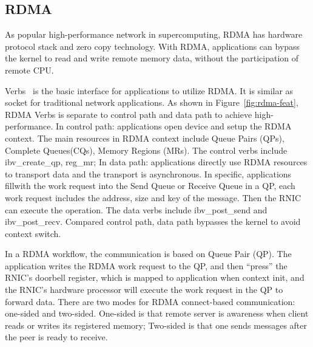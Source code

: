 \subsection{RDMA}
As popular high-performance network in supercomputing, RDMA has hardware protocol stack and zero copy technology. With RDMA, applications can bypass the kernel to read and write remote memory data, without the participation of remote CPU. 

Verbs~\cite{verbs} is the basic interface for applications to utilize RDMA. It is similar as socket for traditional network applications. As shown in Figure~\ref{fig:rdma-feat}, RDMA Verbs is separate to control path and data path to achieve high-performance. In control path: applications open device and setup the RDMA context. The main resources in RDMA context include Queue Pairs (QPs), Complete Queues(CQs), Memory Regions (MRs). The control verbs include ibv\_create\_qp, reg\_mr;  In data path: applications directly use RDMA resources to transport data and the transport is asynchronous. In specific, applications fillwith the work request into the Send Queue or Receive Queue in a QP, each work request includes the address, size and key of the message. Then the RNIC can execute the operation. The data verbs include ibv\_post\_send and ibv\_post\_recv. Compared control path, data path bypasses the kernel to avoid context switch.

In a RDMA workflow, the communication is based on Queue Pair (QP). The application writes the RDMA work request to the QP, and then ``press''  the RNIC's doorbell register, which is mapped to application when context init, and the RNIC's hardware processor will execute the work request in the QP to forward data. There are two modes for RDMA connect-based communication: one-sided and two-sided. One-sided is that remote server is awareness when client reads or writes its registered memory; Two-sided is that one sends messages after the peer is ready to receive.
